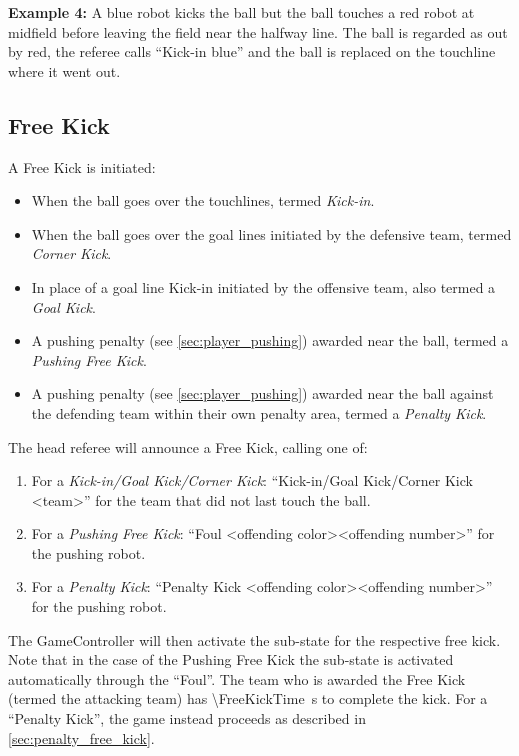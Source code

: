   \textbf{Example 4:} A blue robot kicks the ball but the ball touches a red robot at midfield before leaving the field near the halfway line. The ball is regarded as out by red, the referee calls ``Kick-in blue'' and the ball is replaced on the touchline where it went out.

\subsection{Free Kick}
\label{sec:free_kick}

A Free Kick is initiated:
\begin{itemize}
  \item When the ball goes over the touchlines, termed \emph{Kick-in}.
  \item When the ball goes over the goal lines initiated by the defensive team, termed \emph{Corner Kick}.
  \item In place of a goal line Kick-in initiated by the offensive team, also termed a \emph{Goal Kick}.
  \item A pushing penalty (see \cref{sec:player_pushing}) awarded near the ball, termed a \emph{Pushing Free Kick}.
  \item A pushing penalty (see \cref{sec:player_pushing}) awarded near the ball against the defending team within their own penalty area, termed a \textit{Penalty Kick}.
\end{itemize}

The head referee will announce a Free Kick, calling one of:
\begin{enumerate}
  \item For a \textit{Kick-in/Goal Kick/Corner Kick}: ``Kick-in/Goal Kick/Corner Kick \textless team\textgreater'' for the team that did not last touch the ball.
  \item For a \textit{Pushing Free Kick}: ``Foul \textless offending color\textgreater \textless offending number\textgreater'' for the pushing robot.
  \item For a \textit{Penalty Kick}:  ``Penalty Kick \textless offending color\textgreater \textless offending number\textgreater'' for the pushing robot.
\end{enumerate}

The GameController will then activate the sub-state for the respective free kick. Note that in the case of the Pushing Free Kick the sub-state is activated automatically through the ``Foul''.
The team who is awarded the Free Kick (termed the attacking team) has \qty{\FreeKickTime}{\second} to complete the kick.
For a ``Penalty Kick'', the game instead proceeds as described in \cref{sec:penalty_free_kick}.

